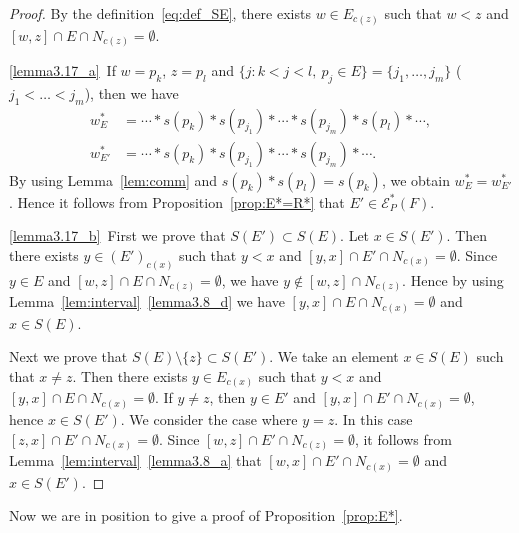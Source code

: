 \documentclass[10pt]{amsart}
\theoremstyle{definition}
\theoremstyle{remark}
\newcommand\EE{\mathcal{E}}
\begin{document}
\begin{proof}
By the definition~\eqref{eq:def_SE}, 
there exists $w \in E_{c(z)}$ such that $w < z$ and $[w,z] \cap E \cap N_{c(z)} = \emptyset$.

\ref{lemma3.17_a}~If $w = p_k$, $z = p_l$ and $\{ j : k < j < l, \ p_j \in E \} = \{ j_1, \dots, j_m \}$ 
($j_1 < \dots < j_m$), then we have 
\begin{align*}
w^*_E &= \cdots * s(p_k) * s(p_{j_1}) * \cdots * s(p_{j_m}) * s(p_l) * \cdots,
\\
w^*_{E'} &= \cdots * s(p_k) * s(p_{j_1}) * \cdots * s(p_{j_m}) * \cdots.
\end{align*}
By using Lemma~\ref{lem:comm} and $s(p_k)*s(p_l) = s(p_k)$, 
we obtain $w^*_E = w^*_{E'}$.
Hence it follows from Proposition~\ref{prop:E*=R*} that $E' \in \EE^*_P(F)$.

\ref{lemma3.17_b}~First we prove that $S(E') \subset S(E)$.
Let $x \in S(E')$.
Then there exists $y \in (E')_{c(x)}$ such that $y < x $ and $[y,x] \cap E' \cap N_{c(x)} = \emptyset$.
Since $y \in E$ and $[w,z] \cap E \cap N_{c(z)} = \emptyset$, we have $y \not\in [w,z] \cap N_{c(z)}$.
Hence by using Lemma~\ref{lem:interval}~\ref{lemma3.8_d} we have $[y,x] \cap E \cap N_{c(x)} = \emptyset$ and $x \in S(E)$.

Next we prove that $S(E) \setminus \{ z \} \subset S(E')$.
We take an element $x \in S(E)$ such that $x \neq z$.
Then there exists $y \in E_{c(x)}$ such that $y<x$ and $[y,x] \cap E \cap N_{c(x)} = \emptyset$.
If $y \neq z$, then $y \in E'$ and $[y,x] \cap E' \cap N_{c(x)} = \emptyset$, hence $x \in S(E')$.
We consider the case where $y = z$.
In this case $[z,x] \cap E' \cap N_{c(x)} = \emptyset$.
Since $[w,z] \cap E' \cap N_{c(z)} = \emptyset$, it follows from Lemma~\ref{lem:interval}~\ref{lemma3.8_a} 
that $[w,x] \cap E' \cap N_{c(x)} = \emptyset$ and $x \in S(E')$.
\end{proof}

Now we are in position to give a proof of Proposition~\ref{prop:E*}.
\end{document}
